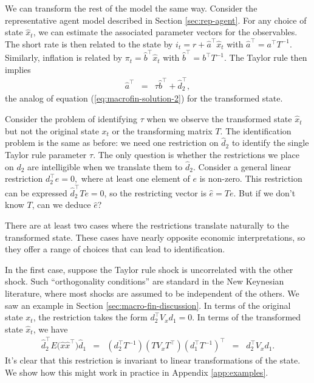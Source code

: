 \documentclass[11pt]{article}
\begin{document}
{We can transform the rest of the model the same way.
Consider the representative agent model described in Section \ref{sec:rep-agent}.
For any choice of state $\hat{x}_t$,
we can estimate the associated parameter vectors for the observables.
The short rate is then related to the state by
$ i_t = r + \hat{a}^{\top} \hat{x}_t$
with $ \hat{a}^{\top } = a^\top T^{-1}$.
Similarly, inflation is related by
$\pi_t = \hat{b}^{\top} \hat{x}_t$ with $ \hat{b}^{\top} = b^\top T^{-1}$.
The Taylor rule then implies
\begin{eqnarray*}
    \hat{a}^{\top} &=& \tau \hat{b}^{\top} + \hat{d}_2^{\top} ,
\end{eqnarray*}
the analog of equation (\ref{eq:macrofin-solution-2}) for the transformed state.

Consider the problem of identifying $\tau$ when we observe
the transformed state $\hat{x}_t$ but not the original state $x_t$
or the transforming matrix $T$.
The identification problem is the same as before:
we need one restriction on $ \hat{d}_2$ to identify
the single Taylor rule parameter $\tau$.
The only question is whether the restrictions we place on $d_2$
are intelligible when we translate them to $\hat{d}_2$.
Consider a general linear restriction $d_2^{\top} e =0,$
where at least one element of $e$ is non-zero.
This restriction can be expressed  $\hat{d}_2^{\top} T e =0$,
so the restricting vector is $\hat{e}=Te$.
But if we don't know $T$, can we deduce $\hat{e}$?

There are at least two cases where the restrictions
translate naturally to the transformed state.
These cases have nearly opposite economic interpretations,
so they offer a range of choices that can lead to identification.

In the first case, suppose the Taylor rule shock is uncorrelated with the other shock.
Such ``orthogonality conditions'' are standard in the New Keynesian literature,
where most shocks are assumed to be independent of the others.
We saw an example in Section \ref{sec:macro-fin-discussion}.
In terms of the original state $x_t$,
the restriction takes the form $ d_2^\top V_x d_1 = 0$.
In terms of the transformed state $\hat{x}_t$, we have
\begin{eqnarray*}
    \hat{d}_2^{\top} E \big( \hat{x}  \hat{x}^{\top} \big) \hat{d}_1
        &=&  (d_2^\top T^{-1}) (T V_x T^\top) (d_1^\top T^{-1})^\top
        \;\;=\;\; d_2^\top V_x d_1 .
\end{eqnarray*}
It's clear that this restriction is invariant to linear transformations of the state.
We show how this might work in practice in Appendix \ref{app:examples}.

}
\end{document}
